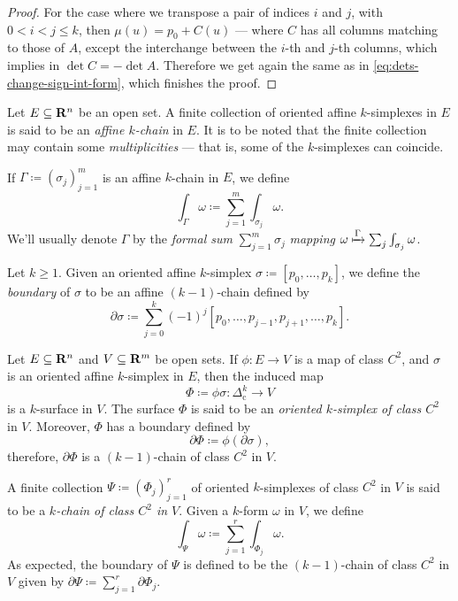 \begin{proof}
    For the case where we transpose a pair of indices \(i\) and \(j\), with \(0 < i
    < j \leq k\), then \(\mu(u) = p_0 + C(u)\) --- where \(C\) has all columns
    matching to those of \(A\), except the interchange between the \(i\)-th and
    \(j\)-th columns, which implies in \(\det C = - \det A\). Therefore we get again
    the same as in \cref{eq:dets-change-sign-int-form}, which finishes the proof.
\end{proof}

\begin{definition}
    \label{def:affine-k-chain}
    Let \(E \subseteq \mathbf{R}^n\) be an open set. A finite collection of oriented affine
    \(k\)-simplexes in \(E\) is said to be an \emph{affine \(k\)-chain} in \(E\). It
    is to be noted that the finite collection may contain some \emph{multiplicities}
    --- that is, some of the \(k\)-simplexes can coincide.

    If \(\Gamma \coloneq (\sigma_j)_{j=1}^m\) is an affine \(k\)-chain in \(E\), we
    define
    \[
        \int_{\Gamma} \omega \coloneq \sum_{j=1}^m \int_{\sigma_j} \omega.
    \]
    We'll usually denote \(\Gamma\) by the \emph{formal sum} \(\sum_{j=1}^m \sigma_j\)
    \emph{mapping} \(\omega \xmapsto{\Gamma} \sum_j \int_{\sigma_j} \omega\).
\end{definition}

\begin{definition}[Boundary]
    \label{def:affine-k-simplex-boundary}
    Let \(k \geq 1\). Given an oriented affine \(k\)-simplex \(\sigma \coloneq [p_0,
        \dots, p_k]\), we define the \emph{boundary} of \(\sigma\) to be an affine
    \((k-1)\)-chain defined by
    \[
        \partial \sigma \coloneq
        \sum_{j=0}^k (-1)^j [p_0, \dots, p_{j-1}, p_{j+1}, \dots, p_k].
    \]
\end{definition}

\begin{definition}
    \label{def:differentiable-simplexes-and-chains}
    Let \(E \subseteq \mathbf{R}^n\) and \(V \subseteq \mathbf{R}^m\) be open sets. If \(\phi: E \to
    V\) is a map of class \(C^2\), and \(\sigma\) is an oriented affine
    \(k\)-simplex in \(E\), then the induced map
    \[
        \Phi \coloneq \phi \sigma: \Delta_{\text{c}}^k \longrightarrow V
    \]
    is a \(k\)-surface in \(V\). The surface \(\Phi\) is said to be an
    \emph{oriented \(k\)-simplex of class \(C^2\)} in \(V\). Moreover, \(\Phi\) has
    a boundary defined by
    \[
        \partial \Phi \coloneq \phi(\partial \sigma),
    \]
    therefore, \(\partial \Phi\) is a \((k-1)\)-chain of class \(C^2\) in \(V\).

    A finite collection \(\Psi \coloneq (\Phi_j)_{j=1}^r\) of oriented
    \(k\)-simplexes of class \(C^2\) in \(V\) is said to be a \emph{\(k\)-chain of
        class \(C^2\) in \(V\)}. Given a \(k\)-form \(\omega\) in \(V\), we define
    \[
        \int_{\Psi} \omega \coloneq \sum_{j=1}^r \int_{\Phi_j} \omega.
    \]
    As expected, the boundary of \(\Psi\) is defined to be the \((k-1)\)-chain of
    class \(C^2\) in \(V\) given by \(\partial \Psi \coloneq \sum_{j=1}^r \partial
    \Phi_j\).
\end{definition}

